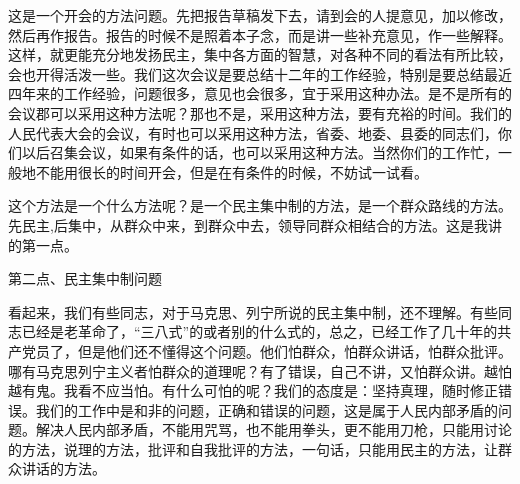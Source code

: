 这是一个开会的方法问题。先把报告草稿发下去，请到会的人提意见，加以修改，然后再作报告。报告的时候不是照着本子念，而是讲一些补充意见，作一些解释。这样，就更能充分地发扬民主，集中各方面的智慧，对各种不同的看法有所比较，会也开得活泼一些。我们这次会议是要总结十二年的工作经验，特别是要总结最近四年来的工作经验，问题很多，意见也会很多，宜于采用这种办法。是不是所有的会议郡可以采用这种方法呢？那也不是，采用这种方法，要有充裕的时间。我们的人民代表大会的会议，有时也可以采用这种方法，省委、地委、县委的同志们，你们以后召集会议，如果有条件的话，也可以采用这种方法。当然你们的工作忙，一般地不能用很长的时间开会，但是在有条件的时候，不妨试一试看。

这个方法是一个什么方法呢？是一个民主集中制的方法，是一个群众路线的方法。先民主,后集中，从群众中来，到群众中去，领导同群众相结合的方法。这是我讲的第一点。

第二点、民主集中制问题

看起来，我们有些同志，对于马克思、列宁所说的民主集中制，还不理解。有些同志已经是老革命了，“三八式”的或者别的什么式的，总之，已经工作了几十年的共产党员了，但是他们还不懂得这个问题。他们怕群众，怕群众讲话，怕群众批评。哪有马克思列宁主义者怕群众的道理呢？有了错误，自己不讲，又怕群众讲。越怕越有鬼。我看不应当怕。有什么可怕的呢？我们的态度是：坚持真理，随时修正错误。我们的工作中是和非的问题，正确和错误的问题，这是属于人民内部矛盾的问题。解决人民内部矛盾，不能用咒骂，也不能用拳头，更不能用刀枪，只能用讨论的方法，说理的方法，批评和自我批评的方法，一句话，只能用民主的方法，让群众讲话的方法。

